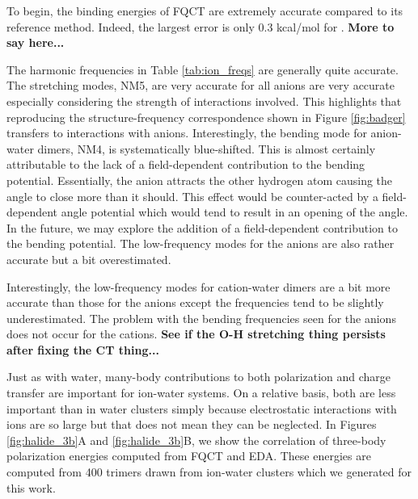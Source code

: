 \documentclass[journal=jacsat,manuscript=article]{achemso}
\begin{document}
To begin, the binding energies of FQCT are extremely accurate compared to its reference
method. Indeed, the largest error is only 0.3 kcal/mol for . \textbf{More 
to say here...}

The harmonic frequencies in Table \ref{tab:ion_freqs} are generally quite accurate. The 
stretching modes, NM5, are very accurate for all anions are very accurate especially considering
the strength of interactions involved. This highlights that reproducing the structure-frequency
correspondence shown in Figure \ref{fig:badger} transfers to interactions with anions.
Interestingly, the bending mode for anion-water dimers, NM4, is systematically blue-shifted. This
is almost certainly attributable to the lack of a field-dependent contribution to the bending
potential. Essentially, the anion attracts the other hydrogen atom causing the  angle to
close more than it should. This effect would be counter-acted by a field-dependent angle potential
which would tend to result in an opening of the  angle.
In the future, we may explore the addition of a field-dependent contribution to the bending potential.
The low-frequency modes for the anions are also rather accurate but a bit overestimated.

Interestingly, the low-frequency modes for cation-water dimers are a bit more accurate than those for the anions except
the frequencies tend to be slightly underestimated. The problem with the bending frequencies
seen for the anions does not occur for the cations. \textbf{See if the O-H stretching thing persists
after fixing the CT thing...}

Just as with water, many-body contributions to both polarization and charge transfer
are important for ion-water systems. On a relative basis, both are less important
than in water clusters simply because electrostatic interactions with ions are so
large but that does not mean they can be neglected. In Figures \ref{fig:halide_3b}A and \ref{fig:halide_3b}B,
we show the correlation of three-body polarization energies computed from FQCT and
EDA. These energies are computed from 400 trimers drawn from ion-water clusters which
we generated for this work.
\end{document}
